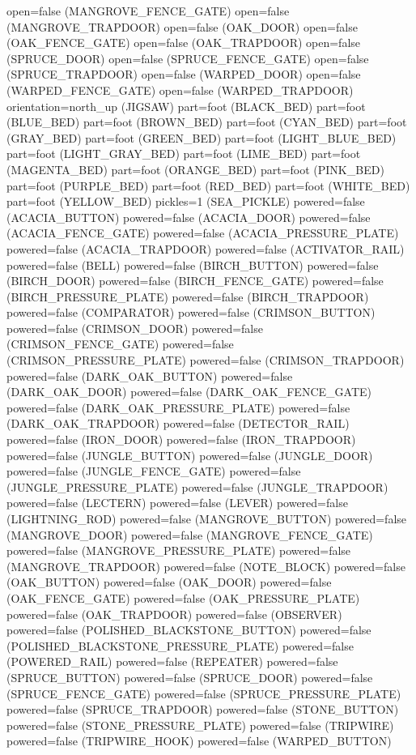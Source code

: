 \documentclass[11pt]{article}
\begin{document}
open=false (MANGROVE_FENCE_GATE)
open=false (MANGROVE_TRAPDOOR)
open=false (OAK_DOOR)
open=false (OAK_FENCE_GATE)
open=false (OAK_TRAPDOOR)
open=false (SPRUCE_DOOR)
open=false (SPRUCE_FENCE_GATE)
open=false (SPRUCE_TRAPDOOR)
open=false (WARPED_DOOR)
open=false (WARPED_FENCE_GATE)
open=false (WARPED_TRAPDOOR)
orientation=north_up (JIGSAW)
part=foot (BLACK_BED)
part=foot (BLUE_BED)
part=foot (BROWN_BED)
part=foot (CYAN_BED)
part=foot (GRAY_BED)
part=foot (GREEN_BED)
part=foot (LIGHT_BLUE_BED)
part=foot (LIGHT_GRAY_BED)
part=foot (LIME_BED)
part=foot (MAGENTA_BED)
part=foot (ORANGE_BED)
part=foot (PINK_BED)
part=foot (PURPLE_BED)
part=foot (RED_BED)
part=foot (WHITE_BED)
part=foot (YELLOW_BED)
pickles=1 (SEA_PICKLE)
powered=false (ACACIA_BUTTON)
powered=false (ACACIA_DOOR)
powered=false (ACACIA_FENCE_GATE)
powered=false (ACACIA_PRESSURE_PLATE)
powered=false (ACACIA_TRAPDOOR)
powered=false (ACTIVATOR_RAIL)
powered=false (BELL)
powered=false (BIRCH_BUTTON)
powered=false (BIRCH_DOOR)
powered=false (BIRCH_FENCE_GATE)
powered=false (BIRCH_PRESSURE_PLATE)
powered=false (BIRCH_TRAPDOOR)
powered=false (COMPARATOR)
powered=false (CRIMSON_BUTTON)
powered=false (CRIMSON_DOOR)
powered=false (CRIMSON_FENCE_GATE)
powered=false (CRIMSON_PRESSURE_PLATE)
powered=false (CRIMSON_TRAPDOOR)
powered=false (DARK_OAK_BUTTON)
powered=false (DARK_OAK_DOOR)
powered=false (DARK_OAK_FENCE_GATE)
powered=false (DARK_OAK_PRESSURE_PLATE)
powered=false (DARK_OAK_TRAPDOOR)
powered=false (DETECTOR_RAIL)
powered=false (IRON_DOOR)
powered=false (IRON_TRAPDOOR)
powered=false (JUNGLE_BUTTON)
powered=false (JUNGLE_DOOR)
powered=false (JUNGLE_FENCE_GATE)
powered=false (JUNGLE_PRESSURE_PLATE)
powered=false (JUNGLE_TRAPDOOR)
powered=false (LECTERN)
powered=false (LEVER)
powered=false (LIGHTNING_ROD)
powered=false (MANGROVE_BUTTON)
powered=false (MANGROVE_DOOR)
powered=false (MANGROVE_FENCE_GATE)
powered=false (MANGROVE_PRESSURE_PLATE)
powered=false (MANGROVE_TRAPDOOR)
powered=false (NOTE_BLOCK)
powered=false (OAK_BUTTON)
powered=false (OAK_DOOR)
powered=false (OAK_FENCE_GATE)
powered=false (OAK_PRESSURE_PLATE)
powered=false (OAK_TRAPDOOR)
powered=false (OBSERVER)
powered=false (POLISHED_BLACKSTONE_BUTTON)
powered=false (POLISHED_BLACKSTONE_PRESSURE_PLATE)
powered=false (POWERED_RAIL)
powered=false (REPEATER)
powered=false (SPRUCE_BUTTON)
powered=false (SPRUCE_DOOR)
powered=false (SPRUCE_FENCE_GATE)
powered=false (SPRUCE_PRESSURE_PLATE)
powered=false (SPRUCE_TRAPDOOR)
powered=false (STONE_BUTTON)
powered=false (STONE_PRESSURE_PLATE)
powered=false (TRIPWIRE)
powered=false (TRIPWIRE_HOOK)
powered=false (WARPED_BUTTON)
\end{document}
